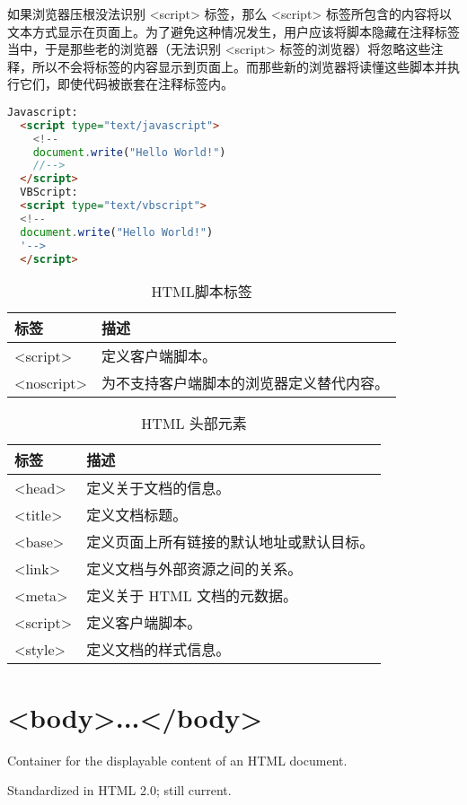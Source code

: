 如果浏览器压根没法识别 <script> 标签，那么 <script> 标签所包含的内容将以文本方式显示在页面上。为了避免这种情况发生，用户应该将脚本隐藏在注释标签当中，于是那些老的浏览器（无法识别 <script> 标签的浏览器）将忽略这些注释，所以不会将标签的内容显示到页面上。而那些新的浏览器将读懂这些脚本并执行它们，即使代码被嵌套在注释标签内。

\begin{lstlisting}[language=HTML]
  Javascript:
  <script type="text/javascript">
    <!--
    document.write("Hello World!")
    //-->
  </script>
  VBScript:
  <script type="text/vbscript">
  <!--
  document.write("Hello World!")
  '-->
  </script>
\end{lstlisting}


\begin{table}[!h]
\centering
\caption{HTML脚本标签}
\begin{tabular}{|l|l|}
\hline
标签			&描述\\
\hline
<script>		&定义客户端脚本。\\
\hline
<noscript>	&为不支持客户端脚本的浏览器定义替代内容。\\
\hline
\end{tabular}
\end{table}


\begin{table}[!h]
\centering
\caption{HTML 头部元素}
\begin{tabular}{|l|l|}
\hline
标签		&描述\\
\hline
<head>	&定义关于文档的信息。\\
\hline
<title>	&定义文档标题。\\
\hline
<base>	&定义页面上所有链接的默认地址或默认目标。\\
\hline
<link>	&定义文档与外部资源之间的关系。\\
\hline
<meta>	&定义关于 HTML 文档的元数据。\\
\hline
<script>	&定义客户端脚本。\\
\hline
<style>	&定义文档的样式信息。\\
\hline
\end{tabular}
\end{table}


\section{<body>...</body>}


Container for the displayable content of an HTML document.

Standardized in HTML 2.0; still current.

